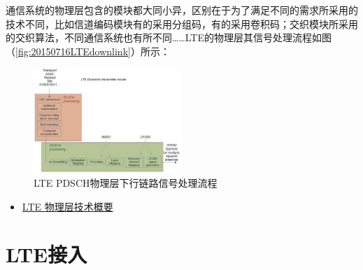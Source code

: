 \documentclass[10pt,a4paper,UTF8]{article}
\begin{document}
通信系统的物理层包含的模块都大同小异，区别在于为了满足不同的需求所采用的技术不同，比如信道编码模块有的采用分组码，有的采用卷积码；交织模块所采用的交织算法，不同通信系统也有所不同\ldots{}\ldots{}LTE的物理层其信号处理流程如图（\ref{fig:20150716LTEdownlink}）所示：
\begin{figure}[htb]
\centering
\includegraphics[width=0.5\textwidth]{../img/20150716LTEdownlink.jpg}
\caption{\label{fig:orgparagraph1}
LTE PDSCH物理层下行链路信号处理流程}
\end{figure}

\begin{itemize}
\item \href{physical/lte-physical-overview.org}{LTE 物理层技术概要}
\end{itemize}
\section{LTE接入}
\label{sec:orgheadline2}
\end{document}
